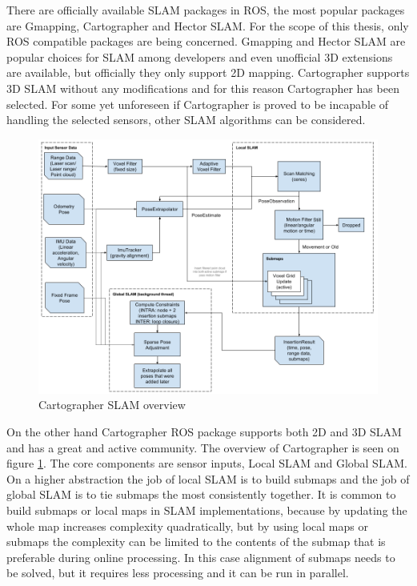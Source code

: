 There are officially available SLAM packages in ROS, the most popular packages are Gmapping, Cartographer and 
Hector SLAM. For the scope of this thesis, only ROS compatible packages are being concerned. Gmapping and Hector
SLAM are popular choices for SLAM among developers and even unofficial 3D extensions are available, but 
officially they only support 2D mapping. Cartographer supports 3D SLAM without any modifications and for 
this reason Cartographer has been selected. For some yet unforeseen if Cartographer is proved to be incapable
of handling the selected sensors, other SLAM algorithms can be considered.
\begin{figure}[!ht]
    \centering
	\includegraphics[width=140mm, keepaspectratio]{figures/cartographer_slam.png}
    \caption{Cartographer SLAM overview\cite{CartographerDocumentation}}
    \label{fig:cartographer_slam_overview}
\end{figure}



On the other hand Cartographer ROS package supports both 2D and 3D SLAM and has a great and active community. The overview 
of Cartographer is seen on figure \ref{fig:cartographer_slam_overview}. The core components are sensor inputs, Local SLAM
and Global SLAM. On a higher abstraction the job of local SLAM is to build submaps and the job of global SLAM is to tie 
submaps the most consistently together. It is common to build submaps or local maps in SLAM implementations, because by 
updating the whole map increases complexity quadratically, but by using local maps or submaps the complexity can be limited
to the contents of the submap that is preferable during online processing. In this case alignment of submaps needs to be solved,
but it requires less processing and it can be run in parallel.

